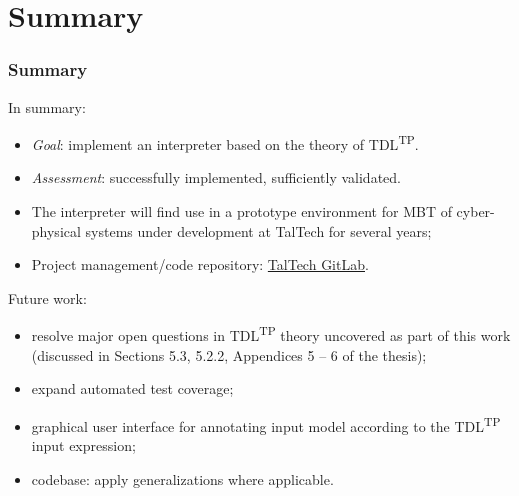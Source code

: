 \documentclass{beamer}
\makeatletter
\def\grenewcommand{\g@star@or@long\renew@command}
\def\g@star@or@long#1{%
      \@ifstar{\let\l@ngrel@x\global#1}{\def\l@ngrel@x{\long\global}#1}}
\newcommand{\recallframetitle}{}
\newcommand{\storeframetitle}[1]{%
    \grenewcommand{\recallframetitle}{#1}%
}
\newcommand{\frametitlestore}[1]{
    \frametitle{#1}%
    \storeframetitle{#1}%
}
\newcommand{\pauseafteritemize}{\pause[\thebeamerpauses]}
\newcommand{\TDLTP}{\texorpdfstring{TDL\textsuperscript{TP}}{TDL(TP)}}
\makeatother
\begin{document}
    \section{Summary}
    \begin{frame}
        \frametitlestore{Summary}
        \par In summary:
        \pause
        \begin{itemize}[<+->]
            \item \textit{Goal}: implement an interpreter based on the theory of \TDLTP{}.
            \item \textit{Assessment}: successfully implemented, sufficiently validated.
            \item The interpreter will find use in a prototype environment for MBT of cyber-physical systems under development at TalTech for several years;
            \item Project management/code repository: \href{https://gitlab.cs.ttu.ee/Tanel.Prikk/iapb/boards}{TalTech GitLab}.
        \end{itemize}
        \pauseafteritemize
        \bigskip
        \par Future work:
        \pause
        \begin{itemize}[<+->]
            \item resolve major open questions in \TDLTP{} theory uncovered as part of this work (discussed in Sections 5.3, 5.2.2, Appendices 5 -- 6 of the thesis);
            \item expand automated test coverage;
            \item graphical user interface for annotating input model according to the \TDLTP{} input expression;
            \item codebase: apply generalizations where applicable.
        \end{itemize}
    \end{frame}
\end{document}
